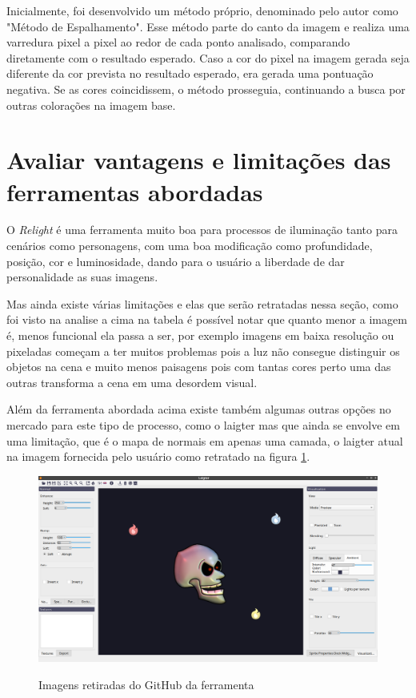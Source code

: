 Inicialmente, foi desenvolvido um método próprio, denominado pelo autor como "Método de Espalhamento". Esse método parte do canto da imagem e realiza uma varredura pixel a pixel ao redor de cada ponto analisado, comparando diretamente com o resultado esperado. Caso a cor do pixel na imagem gerada seja diferente da cor prevista no resultado esperado, era gerada uma pontuação negativa. Se as cores coincidissem, o método prosseguia, continuando a busca por outras colorações na imagem base.

\section{Avaliar vantagens e limitações das ferramentas abordadas}

O \textit{Relight} é uma ferramenta muito boa para processos de iluminação tanto para cenários como personagens, com uma boa modificação como profundidade, posição, cor e luminosidade, dando para o usuário a liberdade de dar personalidade as suas imagens.

Mas ainda existe várias limitações e elas que serão retratadas nessa seção, como foi visto na analise a cima na tabela é possível notar que quanto menor a imagem é, menos funcional ela passa a ser, por exemplo imagens em baixa resolução ou pixeladas começam a ter muitos problemas pois a luz não consegue distinguir os objetos na cena e muito menos paisagens pois com tantas cores perto uma das outras transforma a cena em uma desordem visual.

Além da ferramenta abordada acima existe também algumas outras opções no mercado para este tipo de processo, como o laigter mas que ainda se envolve em uma limitação, que é o mapa de normais em apenas uma camada, o laigter atual na imagem fornecida pelo usuário como retratado na figura \ref{fig:laigter}.

\FloatBarrier
    \begin{figure}[ht]
        \caption{Imagens retiradas do GitHub da ferramenta}
        \centering
        \includegraphics[scale=0.2]{imagens/laigter_example.png}
        \label{fig:laigter}
    \end{figure}
\FloatBarrier
    
